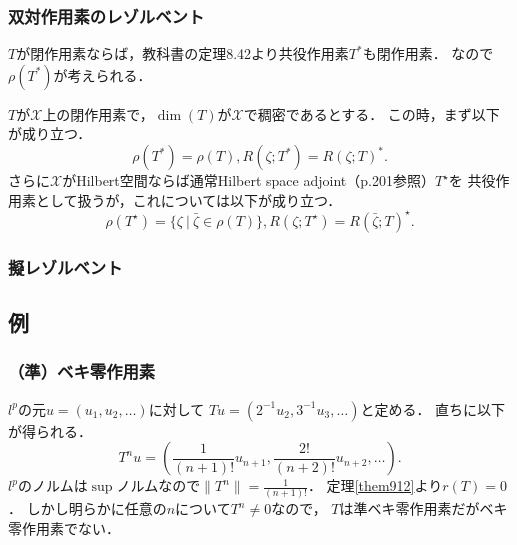 \documentclass[a4j]{jsarticle}
\newcommand{\spX}{\mathscr{X}}
\begin{document}
    \subsubsection{双対作用素のレゾルベント}
    $T$が閉作用素ならば，教科書の定理8.42より共役作用素$T^*$も閉作用素．
    なので$\rho(T^*)$が考えられる．
    \begin{Them}[定理9.9, p.213] \label{them909}
        $T$が$\spX$上の閉作用素で，$\dim(T)$が$\spX$で稠密であるとする．
        この時，まず以下が成り立つ．
        \[ \rho(T^*)=\rho(T), R(\zeta;T^*)=R(\zeta;T)^*. \]
        さらに$\spX$がHilbert空間ならば通常Hilbert space adjoint（p.201参照）$T^{\star}$を
        共役作用素として扱うが，これについては以下が成り立つ．
        \[ \rho(T^{\star})=\{ \zeta ~|~ \bar{\zeta} \in \rho(T)\}, R(\zeta;T^{\star})=R(\bar{\zeta};T)^{\star}. \]
    \end{Them}

    \subsubsection{擬レゾルベント}

    \subsection{例}
        \subsubsection{（準）ベキ零作用素}
        \begin{Example}[例9.14, p.216]
            $l^p$の元$u=(u_1,u_2,\dots)$に対して
            $Tu=(2^{-1}u_2, 3^{-1}u_3, \dots)$と定める．
            直ちに以下が得られる．
            \[ T^n u=\left( \frac{1}{(n+1)!} u_{n+1}, \frac{2!}{(n+2)!} u_{n+2}, \dots \right). \]
            $l^p$のノルムは$\sup$ノルムなので$\|T^n\|=\frac{1}{(n+1)!}$．
            定理\ref{them912}より$r(T)=0$．
            しかし明らかに任意の$n$について$T^n \neq 0$なので，
            $T$は準ベキ零作用素だがベキ零作用素でない．
        \end{Example}
\end{document}
